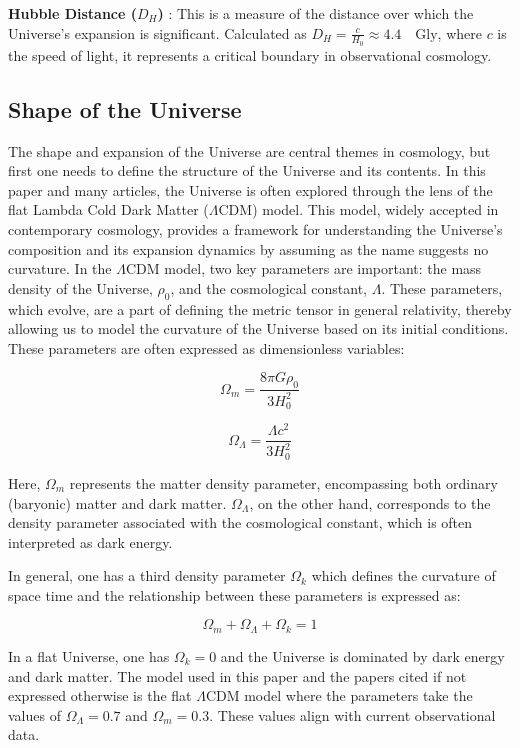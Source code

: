 \documentclass{article}
\begin{document}
\textbf{Hubble Distance ($D_H$) }: This is a measure of the distance over which the Universe's expansion is significant. Calculated as 
$D_H = \frac{c}{H_0} \approx 4.4 \quad \text{Gly}$, where $c$ is the speed of light, 
it represents a critical boundary in observational cosmology. %

\subsection{Shape of the Universe}


The shape and expansion of the Universe are central themes in cosmology, but first one needs to define the structure of the Universe and its contents. 
In this paper and many articles, the Universe is
often explored through the lens of the flat Lambda Cold Dark Matter ($\Lambda$CDM) model. 
This model, widely accepted in contemporary cosmology, provides a framework for understanding the Universe's composition and its expansion dynamics by assuming as the name suggests no curvature.
In the $\Lambda$CDM model, two key parameters are important: the mass density of the Universe, $\rho_0$, and the cosmological constant, $\Lambda$.
These parameters, which evolve, are a part of defining the metric tensor in general relativity, thereby allowing us to model the curvature of the Universe based on its initial conditions.
These parameters are often expressed as dimensionless variables:

$$
\Omega_m = \frac{8\pi G\rho_0}{3H_0^2}
$$

$$
\Omega_\Lambda = \frac{\Lambda c^2}{3H_0^2}
$$

Here, $\Omega_m$ represents the matter density parameter, encompassing both ordinary (baryonic) matter and dark matter. 
$\Omega_\Lambda$, on the other hand, corresponds to the density parameter associated with the cosmological constant, which is often interpreted as dark energy.




In general, one has a third density parameter $\Omega_k$ which defines the curvature of space time and the relationship between these parameters is expressed as: 

$$
\Omega_m + \Omega_\Lambda + \Omega_k = 1
$$


In a flat Universe, one has $\Omega_k = 0$ and the Universe is dominated by dark energy and dark matter. The model used in this paper and the papers cited if not expressed otherwise is the flat $\Lambda$CDM model where the parameters take the values of 
$\Omega_\Lambda = 0.7$ and $\Omega_m = 0.3$. These values align with current observational data.
\end{document}
